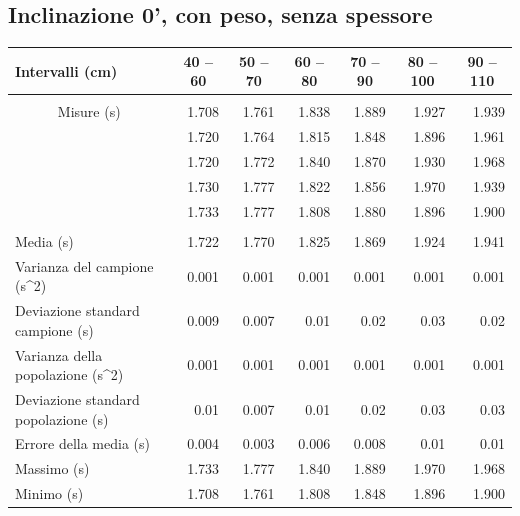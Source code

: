 \documentclass[12pt]{article} %
\begin{document}
	\subsection {Inclinazione 0', con peso, senza spessore}
		\begin{table}[H]
			\begin{tabular}{|l|r|r|r|r|r|r|}
			\hline
			Intervalli (cm) & \multicolumn{1}{c|}{40 – 60} & \multicolumn{1}{c|}{50 – 70} & \multicolumn{1}{c|}{60 – 80} & \multicolumn{1}{c|}{70 – 90} & \multicolumn{1}{c|}{80 – 100} & \multicolumn{1}{c|}{90 – 110} \\ \hline
			 & \multicolumn{ 6}{l|}{} \\ \hline
			\multicolumn{ 1}{|c|}{Misure (s)} & 1.708 & 1.761 & 1.838 & 1.889 & 1.927 & 1.939 \\ \cline{ 2- 7}
			\multicolumn{ 1}{|l|}{} & 1.720 & 1.764 & 1.815 & 1.848 & 1.896 & 1.961 \\ \cline{ 2- 7}
			\multicolumn{ 1}{|l|}{} & 1.720 & 1.772 & 1.840 & 1.870 & 1.930 & 1.968 \\ \cline{ 2- 7}
			\multicolumn{ 1}{|l|}{} & 1.730 & 1.777 & 1.822 & 1.856 & 1.970 & 1.939 \\ \cline{ 2- 7}
			\multicolumn{ 1}{|l|}{} & 1.733 & 1.777 & 1.808 & 1.880 & 1.896 & 1.900 \\ \hline
			 & \multicolumn{ 6}{c|}{} \\ \hline
			Media (s) & 1.722 & 1.770 & 1.825 & 1.869 & 1.924 & 1.941 \\ \hline
			Varianza del campione (s^2) & 0.001 & 0.001 & 0.001 & 0.001 & 0.001 & 0.001 \\ \hline
			Deviazione standard campione (s) & 0.009 & 0.007 & 0.01 & 0.02 & 0.03 & 0.02 \\ \hline
			Varianza della popolazione (s^2) & 0.001 & 0.001 & 0.001 & 0.001 & 0.001 & 0.001 \\ \hline
			Deviazione standard popolazione (s) & 0.01 & 0.007 & 0.01 & 0.02 & 0.03 & 0.03 \\ \hline
			Errore della media (s) & 0.004 & 0.003 & 0.006 & 0.008 & 0.01 & 0.01 \\ \hline
			Massimo (s) & 1.733 & 1.777 & 1.840 & 1.889 & 1.970 & 1.968 \\ \hline
			Minimo (s) & 1.708 & 1.761 & 1.808 & 1.848 & 1.896 & 1.900 \\ \hline
			\end{tabular}

		\label{0p}
		\end{table}
	
\end{document}
